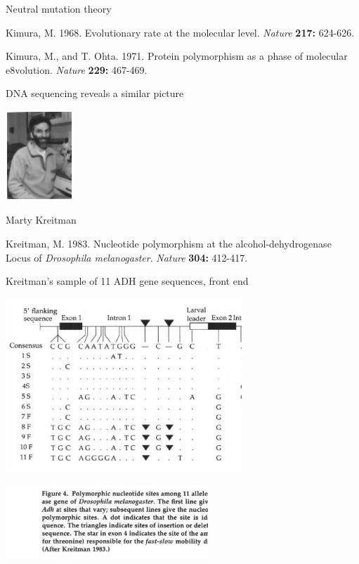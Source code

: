 \documentclass[bluish,slideColor,colorBG]{prosper}
\begin{document}
{\begin{slide}[Replace]{Neutral mutation theory}
{Kimura, M. 1968. Evolutionary rate at the molecular level. {\it Nature}
{\bf 217:} 624-626.

Kimura, M.,  and T. Ohta.  1971.  Protein polymorphism as a phase of molecular
e8volution. {\it Nature} {\bf 229:} 467-469.
}

\end{slide}

\begin{slide}[Replace]{DNA sequencing reveals a similar picture}

\noindent
\centerline{\includegraphics[width=1in]{kreitman2.ps}}

\noindent
\centerline{Marty Kreitman}
\bigskip

\noindent
Kreitman, M. 1983. Nucleotide polymorphism at the alcohol-dehydrogenase Locus
 of {\it Drosophila melanogaster}. {\it Nature} {\bf 304:} 412-417.


\end{slide}

\begin{slide}[Replace]{Kreitman's sample of 11 ADH gene sequences, front end}

\noindent
\centerline{\includegraphics[width=3.5in]{kreitmanexpt1.ps}}
\centerline{\includegraphics[width=3in]{kreitmanexpt3.ps}}


\end{slide}}
\end{document}
